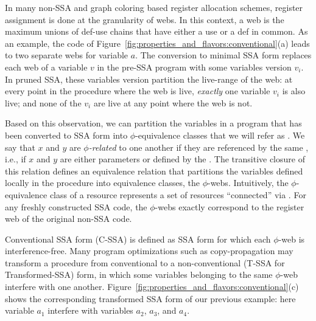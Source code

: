 In many non-SSA and graph coloring based register allocation schemes, register assignment is done at the granularity of webs. In this context, a web is the maximum unions of def-use chains that have either a use or a def in common. As an example, the code of Figure~\ref{fig:properties_and_flavors:conventional}(a) leads to two separate webs for variable $a$.
The conversion to minimal SSA form replaces each web of a variable $v$ in the pre-SSA
program with some variables version $v_i$. In pruned
SSA, these variables version partition the live-range of the web: at every point in the procedure where the web is
live, \emph{exactly} one variable $v_{i}$ is also live; and none of
the $v_{i}$ are live at any point where the web is not. 


Based on this observation, we can partition the variables in a 
program that has been converted to SSA form into $\phi$-equivalence classes that we will refer as \phiwebs\index{\phiweb}. 
We say that $x$ and $y$ are \emph{$\phi$-related} to one another
if they are referenced by the same \phifun, i.e., 
if $x$ and $y$ are either parameters or defined by the \phifun. The transitive closure of this relation defines an equivalence relation that 
partitions the variables defined locally in the procedure into equivalence classes, the $\phi$-webs.
Intuitively, the $\phi$-equivalence class of a resource represents a set of resources ``connected'' via \phifuns.
For any freshly constructed SSA code, the $\phi$-webs exactly correspond to the register web of the original non-SSA code.

Conventional SSA form (C-SSA) is defined as SSA form for which each $\phi$-web
is interference-free. Many program optimizations such as copy-propagation may transform a procedure from conventional
to a non-conventional (T-SSA for Transformed-SSA) form, in which some variables belonging to
the same $\phi$-web interfere with one another. Figure~\ref{fig:properties_and_flavors:conventional}(c)
shows the corresponding transformed SSA form of our previous example: here variable $a_1$ interfere with variables $a_2$, $a_3$, and $a_4$.

